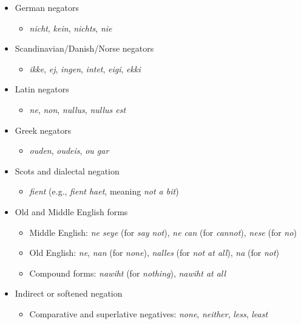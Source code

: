\begin{itemize}[leftmargin=*]
    \item {German negators}
    \begin{itemize}
        \item \textit{nicht}, \textit{kein}, \textit{nichts}, \textit{nie}
    \end{itemize}

    \item {Scandinavian/Danish/Norse negators}
    \begin{itemize}
        \item \textit{ikke}, \textit{ej}, \textit{ingen}, \textit{intet}, \textit{eigi}, \textit{ekki}
    \end{itemize}

    \item {Latin negators}
    \begin{itemize}
        \item \textit{ne}, \textit{non}, \textit{nullus}, \textit{nullus est}
    \end{itemize}

    \item {Greek negators}
    \begin{itemize}
        \item \textit{ouden}, \textit{oudeis}, \textit{ou gar}
    \end{itemize}

    \item {Scots and dialectal negation}
    \begin{itemize}
        \item \textit{fient} (e.g., \textit{fient haet}, meaning \textit{not a bit})
    \end{itemize}

    \item {Old and Middle English forms}
    \begin{itemize}
        \item Middle English: \textit{ne seye} (for \textit{say not}), \textit{ne can} (for \textit{cannot}), \textit{nese} (for \textit{no})
        \item Old English: \textit{ne}, \textit{nan} (for \textit{none}), \textit{nalles} (for \textit{not at all}), \textit{na} (for \textit{not})
        \item Compound forms: \textit{nawiht} (for \textit{nothing}), \textit{nawiht at all}
    \end{itemize}

    \item {Indirect or softened negation}
    \begin{itemize}
        \item Comparative and superlative negatives: \textit{none}, \textit{neither}, \textit{less}, \textit{least}
    \end{itemize}
    \largerpage[2]


\end{itemize}
